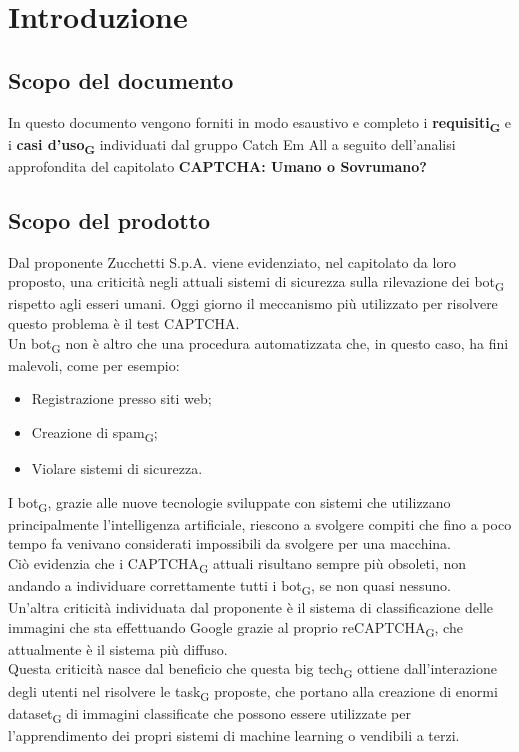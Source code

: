\section{Introduzione}

\subsection{Scopo del documento}
In questo documento vengono forniti in modo esaustivo e completo i \textbf{requisiti\textsubscript{G}} e i \textbf{casi d'uso\textsubscript{G}} individuati dal gruppo Catch Em All a seguito dell'analisi approfondita del capitolato \textbf{CAPTCHA: Umano o Sovrumano?}

\subsection{Scopo del prodotto}
Dal proponente Zucchetti S.p.A. viene evidenziato, nel capitolato da loro proposto, una criticità negli attuali sistemi di sicurezza sulla rilevazione dei bot\textsubscript{G} rispetto agli esseri umani. Oggi giorno il meccanismo più utilizzato per risolvere questo problema è il test CAPTCHA.\\
Un bot\textsubscript{G} non è altro che una procedura automatizzata che, in questo caso, ha fini malevoli, come per esempio:
\begin{itemize}
 	\item Registrazione presso siti web;
	\item Creazione di spam\textsubscript{G};
	\item Violare sistemi di sicurezza.
\end{itemize}
I bot\textsubscript{G}, grazie alle nuove tecnologie sviluppate con sistemi che utilizzano principalmente l'intelligenza artificiale, riescono a svolgere compiti che fino a poco tempo fa venivano considerati impossibili da svolgere per una macchina.\\
Ciò evidenzia che i CAPTCHA\textsubscript{G} attuali risultano sempre più obsoleti, non andando a individuare correttamente tutti i bot\textsubscript{G}, se non quasi nessuno.\\
Un'altra criticità individuata dal proponente è il sistema di classificazione delle immagini che sta effettuando Google grazie al proprio reCAPTCHA\textsubscript{G}, che attualmente è il sistema più diffuso.\\
Questa criticità nasce dal beneficio che questa big tech\textsubscript{G} ottiene dall'interazione degli utenti nel risolvere le task\textsubscript{G} proposte, che portano alla creazione di enormi dataset\textsubscript{G} di immagini classificate che possono essere utilizzate per l'apprendimento dei propri sistemi di machine learning o vendibili a terzi.\\
